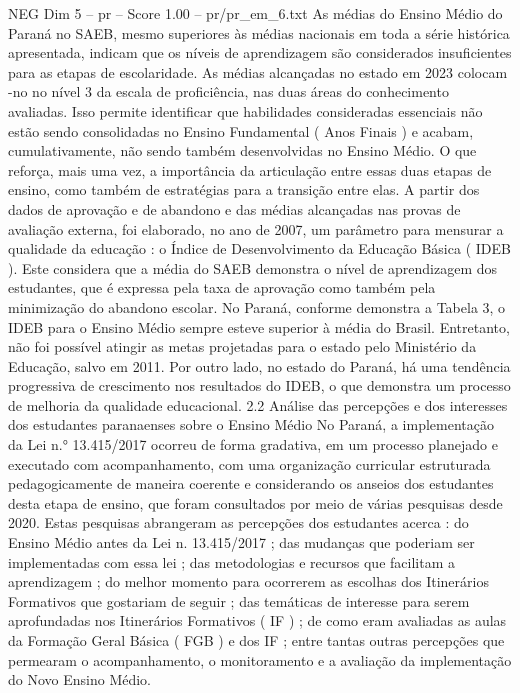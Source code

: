 \begin{textsample}{NEG Dim 5 – pr – Score 1.00 – pr/pr\_em\_6.txt}  \label{ex:f5_neg_234}
As médias do Ensino Médio do Paraná no SAEB, mesmo superiores às médias nacionais em toda a série histórica apresentada, indicam que os níveis de aprendizagem são considerados insuficientes para as etapas de escolaridade.
As médias alcançadas no estado em 2023 colocam -no no nível 3 da escala de proficiência, nas duas áreas do conhecimento avaliadas.
Isso permite identificar que habilidades consideradas essenciais não estão sendo consolidadas no Ensino Fundamental ( Anos Finais ) e acabam, cumulativamente, não sendo também desenvolvidas no Ensino Médio.
O que reforça, mais uma vez, a importância da articulação entre essas duas etapas de ensino, como também de estratégias para a transição entre elas.
A partir dos dados de aprovação e de abandono e das médias alcançadas nas provas de avaliação externa, foi elaborado, no ano de 2007, um parâmetro para mensurar a qualidade da educação : o Índice de Desenvolvimento da Educação Básica ( IDEB ).
Este considera que a média do SAEB demonstra o nível de aprendizagem dos estudantes, que é expressa pela taxa de aprovação como também pela minimização do abandono escolar.
No Paraná, conforme demonstra a Tabela 3, o IDEB para o Ensino Médio sempre esteve superior à média do Brasil.
Entretanto, não foi possível atingir as metas projetadas para o estado pelo Ministério da Educação, salvo em 2011.
Por outro lado, no estado do Paraná, há uma tendência progressiva de crescimento nos resultados do IDEB, o que demonstra um processo de melhoria da qualidade educacional. 2.2 Análise das percepções e dos interesses dos estudantes paranaenses sobre o Ensino Médio No Paraná, a implementação da Lei n.{\EmojiFont °} 13.415/2017 ocorreu de forma gradativa, em um processo planejado e executado com acompanhamento, com uma organização curricular estruturada pedagogicamente de maneira coerente e considerando os anseios dos estudantes desta etapa de ensino, que foram consultados por meio de várias pesquisas desde 2020.
Estas pesquisas abrangeram as percepções dos estudantes acerca : do Ensino Médio antes da Lei n. 13.415/2017 ; das mudanças que poderiam ser implementadas com essa lei ; das metodologias e recursos que facilitam a aprendizagem ; do melhor momento para ocorrerem as escolhas dos Itinerários Formativos que gostariam de seguir ; das temáticas de interesse para serem aprofundadas nos Itinerários Formativos ( IF ) ; de como eram avaliadas as aulas da Formação Geral Básica ( FGB ) e dos IF ; entre tantas outras percepções que permearam o acompanhamento, o monitoramento e a avaliação da implementação do Novo Ensino Médio.

\end{textsample}
